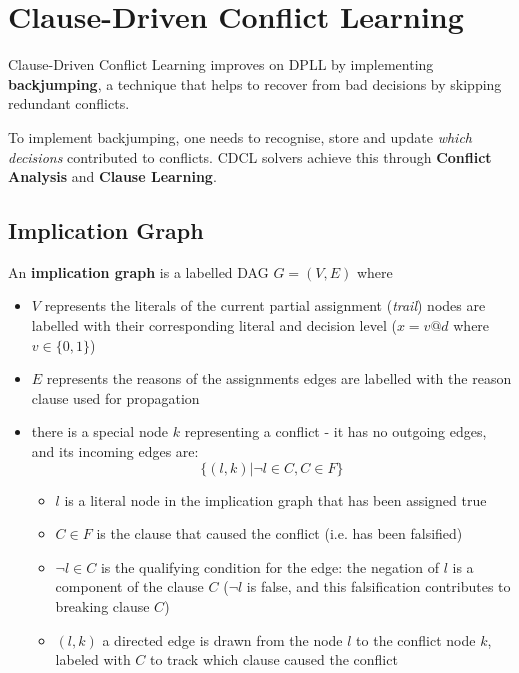 \documentclass[a4paper, 11pt]{report}
\begin{document}
\section{Clause-Driven Conflict Learning}
Clause-Driven Conflict Learning improves on DPLL by implementing \textbf{backjumping}, a technique that helps to recover from bad decisions by skipping redundant conflicts.

To implement backjumping, one needs to recognise, store and update \textit{which decisions} contributed to conflicts. CDCL solvers achieve this through \textbf{Conflict Analysis} and \textbf{Clause Learning}.

\subsection{Implication Graph}
An \textbf{implication graph} is a labelled DAG $G = (V, E)$ where
\begin{itemize}
    \item $V$ represents the literals of the current partial assignment (\textit{trail})
    \subitem nodes are labelled with their corresponding literal and decision level ($x = v @ d$ where $v \in \{0,1\}$)
    \item $E$ represents the reasons of the assignments
    \subitem edges are labelled with the reason clause used for propagation
\item there is a special node $k$ representing a conflict - it has no outgoing edges, and its incoming edges are:
    $$\{(l, k) | \neg l \in C, C \in F\}$$
    \begin{itemize}
        \item $l$ is a literal node in the implication graph that has been assigned true
        \item $C \in F$ is the clause that caused the conflict (i.e. has been falsified)
        \item $\neg l \in C$ is the qualifying condition for the edge: the negation of $l$ is a component of the clause $C$ ($\neg l$ is false, and this falsification contributes to breaking clause $C$)
        \item $(l,k)$ a directed edge is drawn from the node $l$ to the conflict node $k$, labeled with $C$ to track which clause caused the conflict
    \end{itemize}
\end{itemize}
\end{document}
